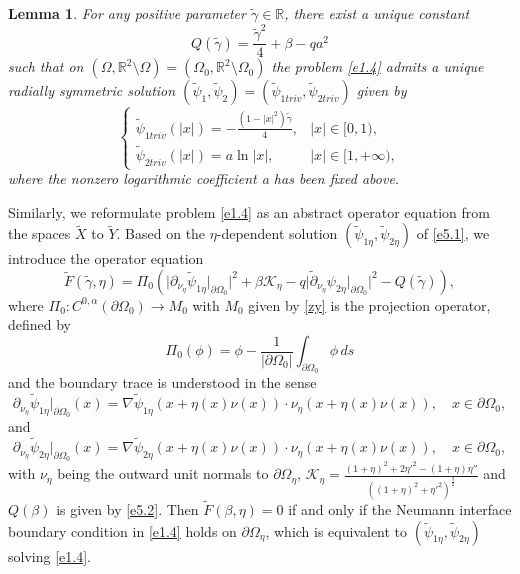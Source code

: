 \documentclass[reqno]{amsart}
\numberwithin{equation}{section}
\newtheorem{lemma}[theorem]{Lemma}
\numberwithin{equation}{section}
\numberwithin{equation}{section}
\begin{document}
\begin{lemma}\label{lem5.1}
For any positive parameter \(\widetilde{\gamma} \in \mathbb{R}\), there exist a unique constant
\begin{equation}\label{e5.2}
Q(\widetilde{\gamma}) = \frac{\widetilde{\gamma}^2}{4}+\beta-qa^2
\end{equation}
such that on \((\Omega, \mathbb{R}^2\setminus \Omega) = (\Omega_0, \mathbb{R}^2\setminus \Omega_0)\) the problem \eqref{e1.4} admits a unique radially symmetric solution $(\widetilde{\psi}_1,\widetilde{\psi}_2)=(\widetilde{\psi}_{1triv},\widetilde{\psi}_{2triv})$ given by
\begin{equation}\label{e5.3}
\begin{cases}
\widetilde{\psi}_{1triv}(|x|) = -\frac{\left(1-|x|^2\right)\widetilde{\gamma}}{4}, & |x| \in [0,1), \\
\widetilde{\psi}_{2triv}(|x|) = a\ln |x|, & |x| \in [1,+\infty),
\end{cases}
\end{equation}
where the nonzero logarithmic coefficient a has been fixed above.
\end{lemma}

Similarly, we reformulate problem \eqref{e1.4} as an abstract operator equation from the spaces \(\widetilde{X}\) to \(\widetilde{Y}\).
Based on the \(\eta\)-dependent solution $(\widetilde{\psi}_{1\eta},\widetilde{\psi}_{2\eta})$ of \eqref{e5.1}, we introduce the operator equation
\begin{equation}\label{e5.4}
\widetilde{F}(\widetilde{\gamma},\eta) =\Pi_0\left( \big| \partial_{\nu_\eta} \widetilde{\psi}_{1\eta}\big|_{\partial \Omega_0}\big|^2+\beta\mathcal{K}_{\eta}-q\big| \widetilde{\partial}_{\nu_\eta} \psi_{2\eta}\big|_{\partial \Omega_0}\big|^2-Q(\widetilde{\gamma})\right) ,
\end{equation}
where $\Pi_0:C^{0,\alpha}(\partial \Omega_0)\rightarrow M_0$ with $M_0$ given by \eqref{zy} is the projection operator, defined by
$$
 \Pi_0(\phi)=\phi-\frac{1}{|\partial \Omega_0|}\int_{\partial \Omega_0}\phi\, ds
$$
and the boundary trace is understood in the sense
\[
\partial_{\nu_\eta} \widetilde{\psi}_{1\eta}\big|_{\partial \Omega_0}(x) = \nabla \widetilde{\psi}_{1\eta}(x + \eta(x)\nu(x)) \cdot \nu_\eta(x + \eta(x)\nu(x)), \quad x \in \partial \Omega_0,
\]
and
\[
\partial_{\nu_\eta} \widetilde{\psi}_{2\eta}\big|_{\partial \Omega_0}(x) = \nabla \widetilde{\psi}_{2\eta}(x + \eta(x)\nu(x)) \cdot \nu_\eta(x + \eta(x)\nu(x)), \quad x \in \partial \Omega_0,
\]
with $\nu_{\eta}$ being the outward unit normals to $\partial\Omega_{\eta}$, $\mathcal{K}_{\eta}=\frac{(1+\eta)^2+2\eta'^{2}-(1+\eta)\eta''}{\left((1+\eta)^2+\eta'^{2}\right)^{\frac{3}{2}}}$ and $Q(\beta)$ is given by \eqref{e5.2}. Then \(\widetilde{F}(\beta,\eta) = 0\) if and only if the Neumann interface boundary condition in \eqref{e1.4} holds on \(\partial \Omega_\eta\), which is equivalent to \((\widetilde{\psi}_{1\eta}, \widetilde{\psi}_{2\eta})\) solving \eqref{e1.4}.
\end{document}
